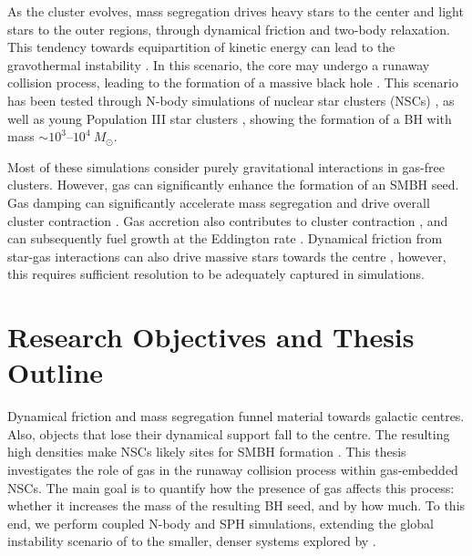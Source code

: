 As the cluster evolves, mass segregation drives heavy stars to the center and light stars to the outer regions, through dynamical friction and two-body relaxation. This tendency towards equipartition of kinetic energy can lead to the gravothermal instability \citep{1987degc.book.....S}. In this scenario, the core may undergo a runaway collision process, leading to the formation of a massive black hole \citep{gurkan2004formation,rasio2003formation,escala2021observational}. This scenario has been tested through N-body simulations of nuclear star clusters (NSCs) \citep{das2021formation,vergara2023global,vergara2024efficiency,vergara2025rapid,portegies2002runaway,portegies2004formation,sakurai2017formation}, as well as young Population III star clusters \citep{freitag2006runaway_a,freitag2006runaway_b,vergara2021stellar,reinoso2020effects,reinoso2023formation}, showing the formation of a BH with mass $\sim 10^3$--$10^4~M_{\odot}$.

Most of these simulations consider purely gravitational interactions in gas-free clusters. However, gas can significantly enhance the formation of an SMBH seed. Gas damping can significantly accelerate mass segregation and drive overall cluster contraction \citep{leigh2014stellar}. Gas accretion also contributes to cluster contraction \citep{bonnell2002accretion,reinoso2024formation}, and can subsequently fuel growth at the Eddington rate \citep{chung2026dense}. Dynamical friction from star-gas interactions can also drive massive stars towards the centre \citep{ostriker1999dynamical,leigh2014stellar}, however, this requires sufficient resolution to be adequately captured in simulations.

\section{Research Objectives and Thesis Outline}
\label{sec:1.3_Objetcives}

Dynamical friction and mass segregation funnel material towards galactic centres. Also, objects that lose their dynamical support fall to the centre. The resulting high densities make NSCs likely sites for SMBH formation \citep{shlosman1990fuelling,escala2006fueling,naiman2015role}. This thesis investigates the role of gas in the runaway collision process within gas-embedded NSCs. The main goal is to quantify how the presence of gas affects this process: whether it increases the mass of the resulting BH seed, and by how much. To this end, we perform coupled N-body and SPH simulations, extending the global instability scenario of \citet{escala2021observational} to the smaller, denser systems explored by \citet{vergara2023global}.

